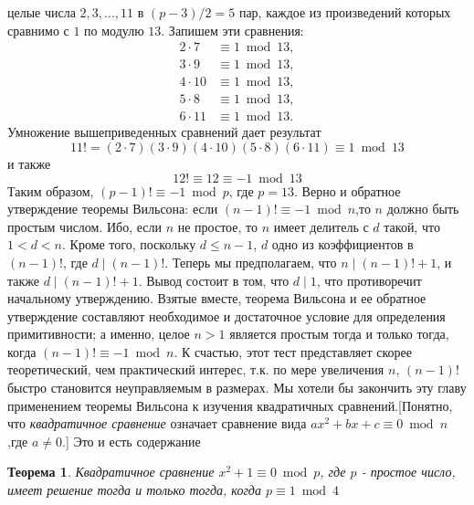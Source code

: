 \documentclass[11pt]{article}
\newtheorem{theorem}{Теорема}
\begin{document}
целые числа $2, 3, ..., 11$ в $(p-3)/2=5$ пар, каждое из произведений которых сравнимо с $1$ по модулю $13$. Запишем эти сравнения: 
\begin{equation*}
\begin{split}
	2\cdot7&\equiv 1\bmod 13,
	\\3\cdot9&\equiv 1\bmod 13,
	\\4\cdot10&\equiv 1\bmod 13,
	\\5\cdot8&\equiv 1\bmod 13,
	\\6\cdot11&\equiv 1\bmod 13.
\end{split}
\end{equation*}
Умножение вышеприведенных сравнений дает результат
	\[11! = (2\cdot7)(3\cdot9)(4\cdot10)(5\cdot8)(6\cdot11)\equiv1\bmod13\]
и также
	\[12!\equiv12\equiv-1\bmod13\]
Таким образом, $(p-1)!\equiv-1\bmod p$, где $p=13$.
\parindent Верно и обратное утверждение теоремы Вильсона: если $(n-1)!\equiv-1\bmod n$,то $n$ должно быть простым числом. Ибо, если $n$ не простое, то $n$ имеет делитель с $d$ такой, что $1<d<n$. Кроме того, поскольку $d\le n-1$, $d$ одно из коэффициентов в $(n-1)!$, где $d\mid(n-1)!$. Теперь мы предполагаем, что $n\mid(n-1)!+1$, и также $d\mid(n-1)!+1$. Вывод состоит в том, что $d\mid1$, что противоречит начальному утверждению.
Взятые вместе, теорема Вильсона и ее обратное утверждение составляют необходимое и достаточное условие для определения примитивности; а именно, целое $n>1$ является простым тогда и только тогда, когда $(n-1)!\equiv-1\bmod n$. К счастью, этот тест представляет скорее теоретический, чем практический интерес, т.к. по мере увеличения $n$, $(n-1)!$ быстро становится неуправляемым в размерах.
Мы хотели бы закончить эту главу применением теоремы Вильсона к изучения квадратичных сравнений.[Понятно, что \textit{квадратичное сравнение} означает сравнение вида $ax^2+bx+c\equiv0\bmod n$,где $a\neq0$.] Это и есть содержание
\begin{theorem}\label{task:b}
	Квадратичное сравнение $x^2+1\equiv 0 \bmod p$, где $p$ - простое число, имеет решение тогда и только тогда, когда $p\equiv 1\bmod 4$
\end{theorem}
\end{document}
